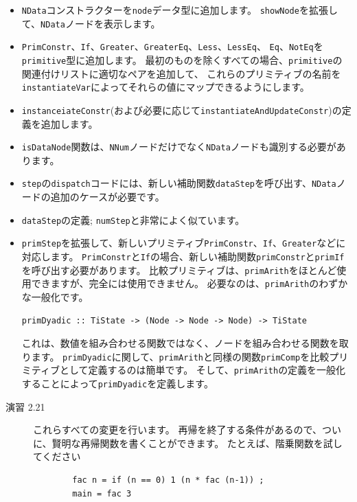 \documentclass{jbook}
\begin{document}
\begin{itemize}
	\item \texttt{NData}コンストラクターを\texttt{node}データ型に追加します。
	      \texttt{showNode}を拡張して、\texttt{NData}ノードを表示します。
	\item \texttt{PrimConstr}、\texttt{If}、\texttt{Greater}、\texttt{GreaterEq}、\texttt{Less}、\texttt{LessEq}、
	      \texttt{Eq}、\texttt{NotEq}を\texttt{primitive}型に追加します。
	      最初のものを除くすべての場合、\texttt{primitive}の関連付けリストに適切なペアを追加して、
	      これらのプリミティブの名前を\texttt{instantiateVar}によってそれらの値にマップできるようにします。
	\item \texttt{instanceiateConstr}(および必要に応じて\texttt{instantiateAndUpdateConstr})の定義を追加します。
	\item \texttt{isDataNode}関数は、\texttt{NNum}ノードだけでなく\texttt{NData}ノードも識別する必要があります。
	\item \texttt{step}の\texttt{dispatch}コードには、新しい補助関数\texttt{dataStep}を呼び出す、\texttt{NData}ノードの追加のケースが必要です。
	\item \texttt{dataStep}の定義; \texttt{numStep}と非常によく似ています。
	\item \texttt{primStep}を拡張して、新しいプリミティブ\texttt{PrimConstr}、\texttt{If}、\texttt{Greater}などに対応します。
	      \texttt{PrimConstr}と\texttt{If}の場合、新しい補助関数\texttt{primConstr}と\texttt{primIf}を呼び出す必要があります。
	      比較プリミティブは、\texttt{primArith}をほとんど使用できますが、完全には使用できません。
	      必要なのは、\texttt{primArith}のわずかな一般化です。
	      \begin{verbatim}
primDyadic :: TiState -> (Node -> Node -> Node) -> TiState
\end{verbatim}
	      これは、数値を組み合わせる関数ではなく、ノードを組み合わせる関数を取ります。
	      \texttt{primDyadic}に関して、\texttt{primArith}と同様の関数\texttt{primComp}を比較プリミティブとして定義するのは簡単です。
	      そして、\texttt{primArith}の定義を一般化することによって\texttt{primDyadic}を定義します。
\end{itemize}

\begin{description}
	\item[演習 2.21] これらすべての変更を行います。
		再帰を終了する条件があるので、ついに、賢明な再帰関数を書くことができます。
		たとえば、階乗関数を試してください
		\begin{verbatim}
        fac n = if (n == 0) 1 (n * fac (n-1)) ;
        main = fac 3
\end{verbatim}
\end{description}
\end{document}
